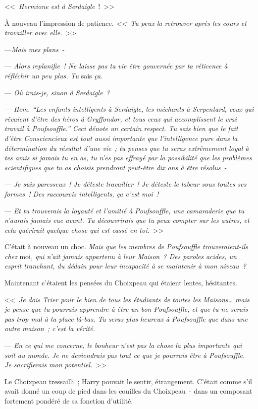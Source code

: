 <<~\emph{Hermione est à Serdaigle}~!~>>

À nouveau l'impression de patience. \emph{<<~Tu peux la retrouver après les cours et travailler avec elle.}~>>

---\emph{Mais mes plans~-}

--- \emph{Alors replanifie~! Ne laisse pas ta vie être gouvernée par ta réticence à réfléchir un peu plus. Tu} sais \emph{ça.}

--- \emph{Où irais-je, sinon à Serdaigle~?}

--- \emph{Hem. “Les enfants intelligents à Serdaigle, les méchants à Serpentard, ceux qui rêvaient d'être des héros à Gryffondor, et tous ceux qui accomplissent le vrai travail à Poufsouffle.” Ceci dénote un certain respect. Tu sais bien que le fait d'être Consciencieux est tout aussi importante que l'intelligence pure dans la détermination du résultat d'une vie~; tu penses que tu seras extrêmement loyal à tes amis si jamais tu en as, tu n'es pas effrayé par la possibilité que les problèmes scientifiques que tu as choisis prendront peut-être dix ans à être résolus~-}

--- \emph{Je suis paresseux~! Je déteste travailler~! Je déteste le labeur sous toutes ses formes~! Des raccourcis intelligents, ça c'est moi~!}

--- \emph{Et tu trouverais la loyauté et l'amitié à Poufsouffle, une camaraderie que tu n'aurais jamais eue avant. Tu découvrirais que tu peux compter sur les autres, et cela guérirait quelque chose qui est cassé en toi.}~>>

C'était à nouveau un choc. \emph{Mais que les membres de Poufsouffle trouveraient-ils chez} moi\emph{, qui n'ait jamais appartenu à leur Maison~? Des paroles acides, un esprit tranchant, du dédain pour leur incapacité à se maintenir à mon niveau~?}

Maintenant c'étaient les pensées du Choixpeau qui étaient lentes, hésitantes.

<<~\emph{Je dois Trier pour le bien de tous les étudiants de toutes les Maisons… mais je pense que tu pourrais apprendre à être un bon Poufsouffle, et que tu ne serais pas trop mal à ta place là-bas. Tu seras plus heureux à Poufsouffle que dans une autre maison~; c'est la vérité.}

--- \emph{En ce qui me concerne, le bonheur n'est pas la chose la plus importante qui soit au monde. Je ne deviendrais pas tout ce que je pourrais être à Poufsouffle. Je sacrifierais mon potentiel.}~>>

Le Choixpeau tressailli~; Harry pouvait le sentir, étrangement. C'était comme s'il avait donné un coup de pied dans les couilles du Choixpeau~- dans un composant fortement pondéré de sa fonction d'utilité.


